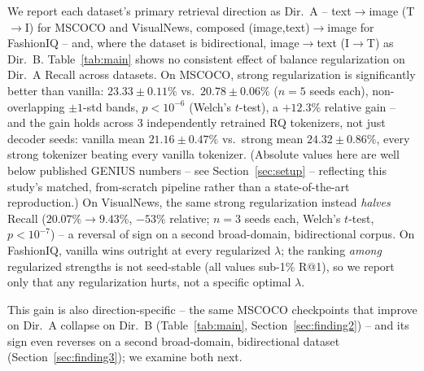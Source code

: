 We report each dataset's primary retrieval direction as Dir.\ A -- text$\to$image (T$\to$I) for MSCOCO and VisualNews, composed (image,text)$\to$image for FashionIQ -- and, where the dataset is bidirectional, image$\to$text (I$\to$T) as Dir.\ B. Table~\ref{tab:main} shows no consistent effect of balance regularization on Dir.\ A Recall across datasets. On MSCOCO, strong regularization is significantly better than vanilla: $23.33\pm0.11\%$ vs.\ $20.78\pm0.06\%$ ($n{=}5$ seeds each), non-overlapping $\pm1$-std bands, $p<10^{-6}$ (Welch's $t$-test), a $+12.3\%$ relative gain -- and the gain holds across 3 independently retrained RQ tokenizers, not just decoder seeds: vanilla mean $21.16\pm0.47\%$ vs.\ strong mean $24.32\pm0.86\%$, every strong tokenizer beating every vanilla tokenizer. (Absolute values here are well below published GENIUS numbers -- see Section~\ref{sec:setup} -- reflecting this study's matched, from-scratch pipeline rather than a state-of-the-art reproduction.) On VisualNews, the same strong regularization instead \emph{halves} Recall ($20.07\%\to9.43\%$, $-53\%$ relative; $n{=}3$ seeds each, Welch's $t$-test, $p<10^{-7}$) -- a reversal of sign on a second broad-domain, bidirectional corpus. On FashionIQ, vanilla wins outright at every regularized $\lambda$; the ranking \emph{among} regularized strengths is not seed-stable (all values sub-1\% R@1), so we report only that any regularization hurts, not a specific optimal $\lambda$.

This gain is also direction-specific -- the same MSCOCO checkpoints that improve on Dir.\ A collapse on Dir.\ B (Table~\ref{tab:main}, Section~\ref{sec:finding2}) -- and its sign even reverses on a second broad-domain, bidirectional dataset (Section~\ref{sec:finding3}); we examine both next.
